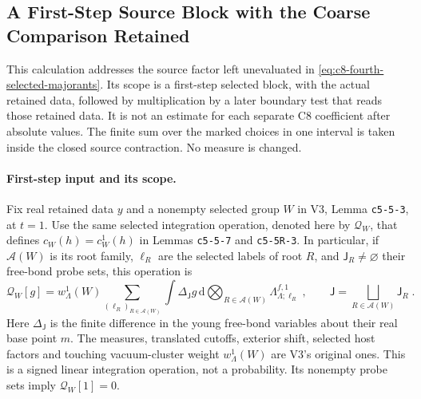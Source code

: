\documentclass[11pt]{article}
\newcommand{\dd}{\mathrm{d}}
\begin{document}
\subsection{A First-Step Source Block with the Coarse Comparison Retained}
\label{sec:c8-fourth-first-seed}

This calculation addresses the source factor left unevaluated in
\eqref{eq:c8-fourth-selected-majorants}. Its scope is a first-step
selected block, with the actual retained data, followed by multiplication
by a later boundary test that reads those retained data. It is not
an estimate for each separate C8 coefficient after absolute values.
The finite sum over the marked choices in one interval is taken
inside the closed source contraction. No measure is changed.

\paragraph{First-step input and its scope.}
Fix real retained data $y$ and a nonempty selected group $W$ in V3,
Lemma \texttt{c5-5-3}, at $t=1$. Use the same selected integration
operation, denoted here by $\mathscr Q_W$, that defines
$c_W(h)=c_W^1(h)$ in Lemmas \texttt{c5-5-7} and
\texttt{c5-5R-3}. In particular, if $\mathcal A(W)$ is its root
family, $\ell_R$ are the selected labels of root $R$, and
$\mathsf J_R\neq\varnothing$ their free-bond probe sets, this operation is
\begin{equation}\label{eq:c8-fourth-seed-operation}
    \mathscr Q_W[g]
        =w_\Lambda^1(W)
            \sum_{(\ell_R)_{R\in\mathcal A(W)}}
                \int \Delta_{\mathsf J}g\,
                    \dd\bigotimes_{R\in\mathcal A(W)}
                        \Lambda_{\Lambda;\ell_R}^{f,1}\;,
    \qquad
    \mathsf J=\bigsqcup_{R\in\mathcal A(W)}\mathsf J_R\;.
\end{equation}
Here $\Delta_{\mathsf J}$ is the finite difference in the young
free-bond variables about their real base point $m$. The measures,
translated cutoffs, exterior shift, selected host factors and
touching vacuum-cluster weight $w_\Lambda^1(W)$ are V3's original
ones. This is a signed linear integration operation, not a
probability. Its nonempty probe sets imply
$\mathscr Q_W[1]=0$.
\end{document}
